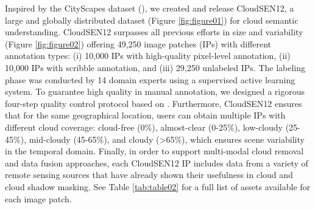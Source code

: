 \documentclass[a4paper, nobind]{templates/cdethesis}
\begin{document}
Inspired by the CityScapes dataset (\cite{Cordts2016}), we created and release CloudSEN12, a large and globally distributed dataset (Figure \ref{fig:figure01}) for cloud semantic understanding. CloudSEN12 surpasses all previous efforts in size and variability (Figure \ref{fig:figure02}) offering 49,250 image patches (IPs) with different annotation types: (i) 10,000 IPs with high-quality pixel-level annotation, (ii) 10,000 IPs with scribble annotation, and (iii) 29,250 unlabeled IPs. The labeling phase was conducted by 14 domain experts using a supervised active learning system. To guarantee high quality in manual annotation, we designed a rigorous four-step quality control protocol based on \cite{Zhu2019}. Furthermore, CloudSEN12 ensures that for the same geographical location, users can obtain multiple IPs with different cloud coverage: cloud-free (0\%), almost-clear (0-25\%), low-cloudy (25-45\%), mid-cloudy (45-65\%), and cloudy (\textgreater65\%), which ensures scene variability in the temporal domain.
Finally, in order to support multi-modal cloud removal\cite{Meraner2020} and data fusion\cite{Singh2018} approaches, each CloudSEN12 IP includes data from a variety of remote sensing sources that have already shown their usefulness in cloud and cloud shadow masking. See Table \ref{tab:table02} for a full list of assets available for each image patch.
\end{document}
